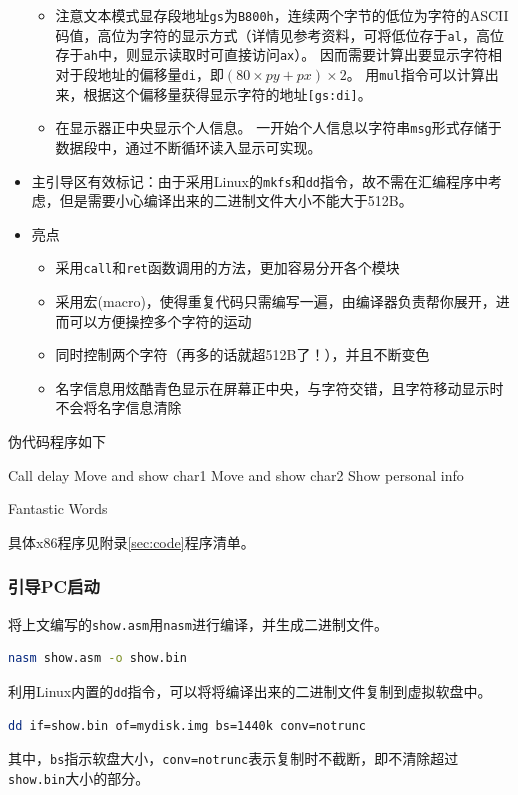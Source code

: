 \documentclass[logo,reportComp]{thesis}
\begin{document}
\begin{itemize}
\begin{itemize}
		\item 注意文本模式显存段地址\verb'gs'为\verb'B800h'，连续两个字节的低位为字符的ASCII码值，高位为字符的显示方式（详情见参考资料，可将低位存于\verb'al'，高位存于\verb'ah'中，则显示读取时可直接访问\verb'ax'）。
		因而需要计算出要显示字符相对于段地址的偏移量\verb'di'，即$(80\times py + px)\times 2$。
		用\verb'mul'指令可以计算出来，根据这个偏移量获得显示字符的地址\verb'[gs:di]'。
		\item 在显示器正中央显示个人信息。
		一开始个人信息以字符串\verb'msg'形式存储于数据段中，通过不断循环读入显示可实现。
	\end{itemize}
	\item 主引导区有效标记：由于采用Linux的\verb'mkfs'和\verb'dd'指令，故不需在汇编程序中考虑，但是需要小心编译出来的二进制文件大小不能大于512B。
	\item 亮点
	\begin{itemize}
		\item 采用\verb'call'和\verb'ret'函数调用的方法，更加容易分开各个模块
		\item 采用宏(macro)，使得重复代码只需编写一遍，由编译器负责帮你展开，进而可以方便操控多个字符的运动
		\item 同时控制两个字符（再多的话就超512B了！），并且不断变色
		\item 名字信息用炫酷青色显示在屏幕正中央，与字符交错，且字符移动显示时不会将名字信息清除
	\end{itemize}
\end{itemize}

伪代码程序如下
\begin{algorithm}[H]
\centering
\begin{algorithmic}[1]
\State Call delay
\State Move and show char1
\State Move and show char2
\State Show personal info
\EndWhile
\end{algorithmic}
\caption{Fantastic Words}
\end{algorithm}
具体x86程序见附录\ref{sec:code}程序清单。


\subsubsection{引导PC启动}
将上文编写的\verb'show.asm'用\verb'nasm'进行编译，并生成二进制文件。
\begin{lstlisting}[language=bash]
nasm show.asm -o show.bin
\end{lstlisting}

利用Linux内置的\verb'dd'指令，可以将将编译出来的二进制文件复制到虚拟软盘中。
\begin{lstlisting}[language=bash]
dd if=show.bin of=mydisk.img bs=1440k conv=notrunc
\end{lstlisting}
其中，\verb'bs'指示软盘大小，\verb'conv=notrunc'表示复制时不截断，即不清除超过\verb'show.bin'大小的部分。
\end{document}
